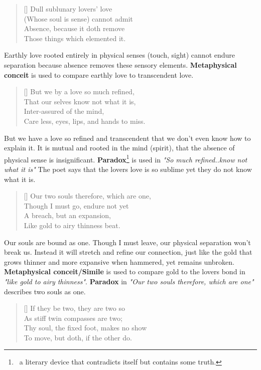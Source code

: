 \documentclass[12pt, a4paper]{article}
\begin{document}
\begin{verse}[\versewidth]
{\fontverse
Dull sublunary lovers' love\\
\vin (Whose soul is sense) cannot admit\\
Absence, because it doth remove\\
\vin Those things which elemented it.
} 
\end{verse}

Earthly love rooted entirely in physical senses (touch, sight) 
cannot endure separation because absence removes these sensory elements.
\textbf{Metaphysical conceit} is used to compare earthly love to transcendent love.

\newpage
\begin{verse}[\versewidth]
{\fontverse
But we by a love so much refined,\\
\vin That our selves know not what it is,\\
Inter-assured of the mind,\\
\vin Care less, eyes, lips, and hands to miss. 
} 
\end{verse}

But we have a love so refined and transcendent that we don't even know how to explain it.
It is mutual and rooted in the mind (spirit), that the absence of 
physical sense is insignificant. \textbf{Paradox}\footnote{
\, a literary device that contradicts itself but contains some truth.} 
is used in \textit{"So much refined..know not what it is"}
The poet says that the lovers love is so sublime yet they do not know what it is.

\begin{verse}[\versewidth]
{\fontverse
Our two souls therefore, which are one,\\
\vin Though I must go, endure not yet\\
A breach, but an expansion,\\
\vin Like gold to airy thinness beat. 
} 
\end{verse}

Our souls are bound as one. Though I must leave, our physical separation won’t break us.
Instead it will stretch and refine our connection, just like the gold that grows thinner and more 
expansive when hammered, yet remains unbroken. \textbf{Metaphysical conceit/Simile} is used to compare 
gold to the lovers bond in \textit{"like gold to airy thinness"}. \textbf{Paradox}
in \textit{"Our two souls therefore, which are one"} describes two souls as one. 

\begin{verse}[\versewidth]
{\fontverse
If they be two, they are two so\\
\vin As stiff twin compasses are two;\\
Thy soul, the fixed foot, makes no show\\
\vin To move, but doth, if the other do. 
} 
\end{verse}
\end{document}
